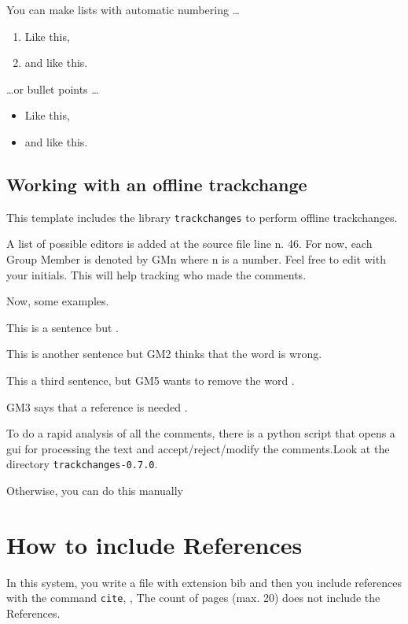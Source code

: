 You can make lists with automatic numbering \dots

\begin{enumerate}
\item Like this,
\item and like this.
\end{enumerate}
\dots or bullet points \dots
\begin{itemize}
\item Like this,
\item and like this.
\end{itemize}


\subsection{Working with an offline trackchange}

This template includes the library {\tt trackchanges}
to perform offline trackchanges.

A list of possible editors is added at the source file line n. 46.
For now, each Group Member is denoted by GMn where n is a number.
Feel free to edit with your initials.
This will help tracking who made the comments.

Now, some examples.

This is a sentence but .

This is another sentence but GM2 thinks that the word  is wrong.

This a third sentence, but GM5 wants to remove the word .  


GM3 says that a reference is needed .


To do a rapid analysis of all the comments, there is a python 
script that opens a gui for processing the text and accept/reject/modify the comments.Look at the directory {\tt trackchanges-0.7.0}. 

Otherwise, you can do this manually 


\section{How to include References}

In this system, you write a file with extension bib and then you include references with
the command \texttt{cite}, \cite{gashi2019influence},
The count of pages (max. 20) does not include the References.

\newpage
{}




